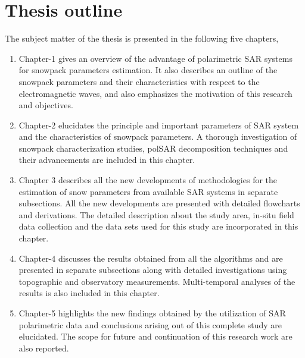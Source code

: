 \section{Thesis outline}
	The subject matter of the thesis is presented in the following five chapters, 
\begin{enumerate}[label=\checkmark]
\item	Chapter-1 gives an overview of the advantage of polarimetric SAR systems for snowpack parameters estimation. It also describes an outline of the snowpack parameters and their characteristics with respect to the electromagnetic waves, and also emphasizes the motivation of this research and objectives.
\item	Chapter-2 elucidates the principle and important parameters of SAR system and the characteristics of snowpack parameters. A thorough investigation of snowpack characterization studies, polSAR decomposition techniques and their advancements are included in this chapter. 
\item	Chapter 3 describes all the new developments of methodologies for the estimation of snow parameters from available SAR systems in separate subsections. All the new developments are presented with detailed flowcharts and derivations. The detailed description about the study area, in-situ field data collection and the data sets used for this study are incorporated in this chapter. 
\item Chapter-4 discusses the results obtained from all the algorithms and are presented in separate subsections along with detailed investigations using topographic and observatory measurements. Multi-temporal analyses of the results is also included in this chapter. 
\item	Chapter-5 highlights the new findings obtained by the utilization of SAR polarimetric data and conclusions arising out of this complete study are elucidated. The scope for future and continuation of this research work are also reported.  
\end{enumerate}

